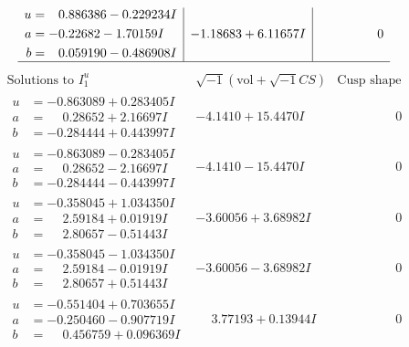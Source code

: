 \documentclass[1p]{elsarticle_modified}
\theoremstyle{definition}
\newcommand{\I}{\sqrt{-1}}
\begin{document}
$$\begin{array}{c|c|c}
\begin{aligned}
u &= \phantom{-}0.886386 - 0.229234 I \\
a &= -0.22682 - 1.70159 I \\
b &= \phantom{-}0.059190 - 0.486908 I\end{aligned}
 & -1.18683 + 6.11657 I & \phantom{-0.000000 } 0\\
 \hline 
 \end{array}$$\newpage$$\begin{array}{c|c|c}  
\text{Solutions to }I^u_{1}& \I (\text{vol} + \sqrt{-1}CS) & \text{Cusp shape}\\
 \hline 
\begin{aligned}
u &= -0.863089 + 0.283405 I \\
a &= \phantom{-}0.28652 + 2.16697 I \\
b &= -0.284444 + 0.443997 I\end{aligned}
 & -4.1410 + 15.4470 I & \phantom{-0.000000 } 0 \\ \hline\begin{aligned}
u &= -0.863089 - 0.283405 I \\
a &= \phantom{-}0.28652 - 2.16697 I \\
b &= -0.284444 - 0.443997 I\end{aligned}
 & -4.1410 - 15.4470 I & \phantom{-0.000000 } 0 \\ \hline\begin{aligned}
u &= -0.358045 + 1.034350 I \\
a &= \phantom{-}2.59184 + 0.01919 I \\
b &= \phantom{-}2.80657 - 0.51443 I\end{aligned}
 & -3.60056 + 3.68982 I & \phantom{-0.000000 } 0 \\ \hline\begin{aligned}
u &= -0.358045 - 1.034350 I \\
a &= \phantom{-}2.59184 - 0.01919 I \\
b &= \phantom{-}2.80657 + 0.51443 I\end{aligned}
 & -3.60056 - 3.68982 I & \phantom{-0.000000 } 0 \\ \hline\begin{aligned}
u &= -0.551404 + 0.703655 I \\
a &= -0.250460 - 0.907719 I \\
b &= \phantom{-}0.456759 + 0.096369 I\end{aligned}
 & \phantom{-}3.77193 + 0.13944 I & \phantom{-0.000000 } 0 \\ \hline\begin{aligned}

\end{aligned}
\end{array}$$
\end{document}
